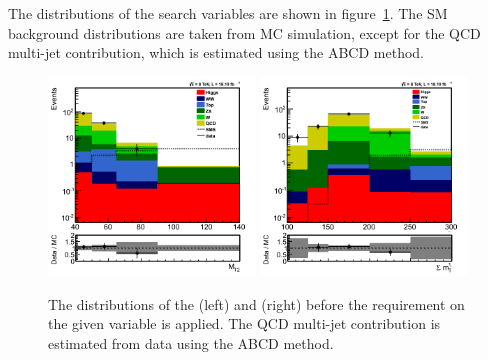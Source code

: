 The distributions 
of the search variables are shown in figure~\ref{fig:5QCDbg}. The SM background distributions are taken from MC simulation, except for 
the QCD multi-jet contribution, which is estimated using the ABCD method.
\begin{figure}[iHhtb]
\centering
\includegraphics[width=0.49\textwidth]{QCDbginTauTau/Bin1_QCDdatdriven.png}
\includegraphics[width=0.49\textwidth]{QCDbginTauTau/Bin2_QCDdatdriven.png} \\
\caption{The distributions of the \mttwo (left) and \SumMT (right) before the requirement on the given variable
is applied. The QCD multi-jet contribution is estimated from data using the ABCD method.}
\label{fig:5QCDbg}
\end{figure}


